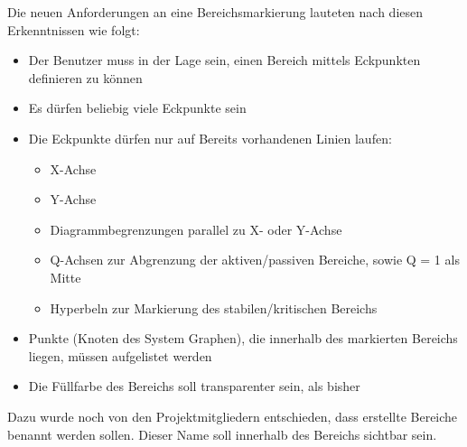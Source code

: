 Die neuen Anforderungen an eine Bereichsmarkierung lauteten nach diesen Erkenntnissen wie folgt:
\begin{itemize}
  \item Der Benutzer muss in der Lage sein, einen Bereich mittels Eckpunkten definieren zu können
  \item Es dürfen beliebig viele Eckpunkte sein
  \item Die Eckpunkte dürfen nur auf Bereits vorhandenen Linien laufen:
  \begin{itemize}
    \item X-Achse
    \item Y-Achse
    \item Diagrammbegrenzungen parallel zu X- oder Y-Achse
    \item Q-Achsen zur Abgrenzung der aktiven/passiven Bereiche, sowie Q = 1 als Mitte
    \item Hyperbeln zur Markierung des stabilen/kritischen Bereichs
  \end{itemize}
  \item Punkte (Knoten des System Graphen), die innerhalb des markierten Bereichs liegen, müssen aufgelistet werden
  \item Die Füllfarbe des Bereichs soll transparenter sein, als bisher
\end{itemize}

Dazu wurde noch von den Projektmitgliedern entschieden, dass erstellte Bereiche benannt werden sollen. Dieser Name soll innerhalb des Bereichs sichtbar sein.
